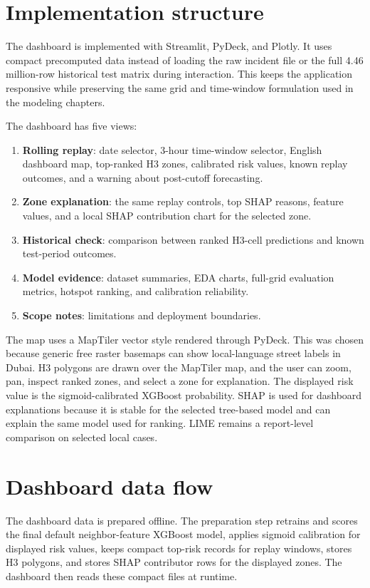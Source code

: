 \section{Implementation structure}

The dashboard is implemented with Streamlit, PyDeck, and Plotly. It uses compact precomputed data instead of loading the raw incident file or the full 4.46 million-row historical test matrix during interaction. This keeps the application responsive while preserving the same grid and time-window formulation used in the modeling chapters.

The dashboard has five views:

\begin{enumerate}
    \item \textbf{Rolling replay}: date selector, 3-hour time-window selector, English dashboard map, top-ranked H3 zones, calibrated risk values, known replay outcomes, and a warning about post-cutoff forecasting.
    \item \textbf{Zone explanation}: the same replay controls, top SHAP reasons, feature values, and a local SHAP contribution chart for the selected zone.
    \item \textbf{Historical check}: comparison between ranked H3-cell predictions and known test-period outcomes.
    \item \textbf{Model evidence}: dataset summaries, EDA charts, full-grid evaluation metrics, hotspot ranking, and calibration reliability.
    \item \textbf{Scope notes}: limitations and deployment boundaries.
\end{enumerate}

The map uses a MapTiler vector style rendered through PyDeck. This was chosen because generic free raster basemaps can show local-language street labels in Dubai. H3 polygons are drawn over the MapTiler map, and the user can zoom, pan, inspect ranked zones, and select a zone for explanation. The displayed risk value is the sigmoid-calibrated XGBoost probability. SHAP is used for dashboard explanations because it is stable for the selected tree-based model and can explain the same model used for ranking. LIME remains a report-level comparison on selected local cases.

\section{Dashboard data flow}

The dashboard data is prepared offline. The preparation step retrains and scores the final default neighbor-feature XGBoost model, applies sigmoid calibration for displayed risk values, keeps compact top-risk records for replay windows, stores H3 polygons, and stores SHAP contributor rows for the displayed zones. The dashboard then reads these compact files at runtime.

